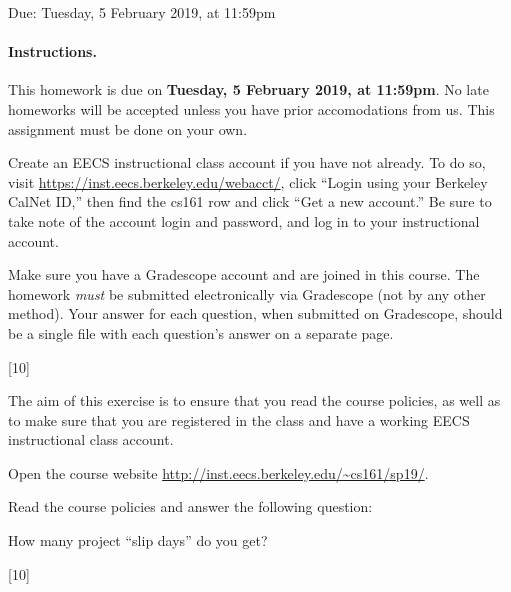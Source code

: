 \documentclass[12pt]{exam}
\newcommand{\solbox}[2]{%
\fbox{%
\parbox[c][#1][t]{\dimexpr\linewidth-2\fboxsep-2\fboxrule}{
  \hrule width \hsize height 0pt
  #2
 }%
}%
\par\vspace{\ht\strutbox}
}
\newcommand{\textfield}[3]{%
\iftoggle{pdfform}{%
\TextField[name = #1, backgroundcolor=white, height=#2,
width = \linewidth, multiline=true]{\mbox}%
}{%
\ifprintanswers\else{%
    \solbox{#2}{#3}}
\fi%
}%
}
\newcommand{\includesolution}[1]{%
\IfFileExists{solutions/#1.tex}{%
\begin{solution}%
%
\end{solution}%
}{}
}
\def\duedate{Tuesday, 5 February 2019}
\begin{document}
\begin{Form}

\begin{center}
  \large
  Due: \duedate, at 11:59pm
\end{center}

\paragraph{Instructions.}
This homework is due on \textbf{\duedate, at 11:59pm}. No late homeworks will be accepted unless you have prior accomodations from us.
This assignment must be done on your own.

Create an EECS instructional class account if you have not already. To do so,
visit \url{https://inst.eecs.berkeley.edu/webacct/}, click ``Login
using your Berkeley CalNet ID,'' then find the cs161 row and click ``Get a new
account.'' Be sure to take note of the account login and password, and log in to
your instructional account.

Make sure you have a Gradescope account and are joined in this course.  The
homework \emph{must} be submitted electronically via Gradescope (not by
any other method).  Your answer for each question,
when submitted on Gradescope, should be a
single file with each question's answer on a separate page.

\begin{questions}
[10]

The aim of this exercise is to ensure that you read the course policies, as
well as to make sure that you are registered in the class and have a working
EECS instructional class account.

Open the course website \url{http://inst.eecs.berkeley.edu/~cs161/sp19/}.

Read the course policies and answer the following question:

How many project ``slip days'' do you get?

\textfield{Q1}{0.5cm}{
There are no "slip days".
}

\vspace{0.12em}

\includesolution{sol1}

\newpage
[10]


\end{questions}
\end{Form}
\end{document}
